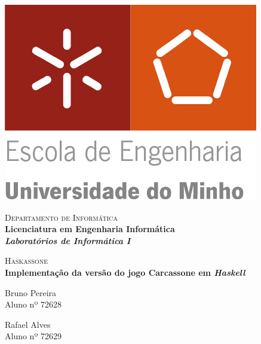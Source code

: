 \begin{titlepage}


\begin{minipage}{0.3\textwidth}
\begin{flushleft} 
\includegraphics[width=\textwidth]{./report/logo.png}
\end{flushleft}
\end{minipage}
\begin{minipage}{0.6\textwidth}
\begin{flushright} 

\textsc{Departamento de Informática}\\[0.1cm]
\bfseries Licenciatura em Engenharia Informática \\ [0.1cm]
\bfseries \textit{Laboratórios de Informática I}\\[8mm]

\end{flushright}
\end{minipage}


\vspace{3cm}


\begin{center}



\textsc{\LARGE Haskassone}\\[1.5cm]


{ \Large \bfseries Implementação da versão do jogo Carcassone em \emph{Haskell} \\[2cm] }




\begin{minipage}{0.4\textwidth}
\begin{flushleft} \large
Bruno Pereira\\
Aluno nº 72628 
\end{flushleft}
\end{minipage}
\begin{minipage}{0.4\textwidth}
\begin{flushright} \large
Rafael Alves\\
Aluno nº 72629
\end{flushright}
\end{minipage}


\end{center}
\end{titlepage}
